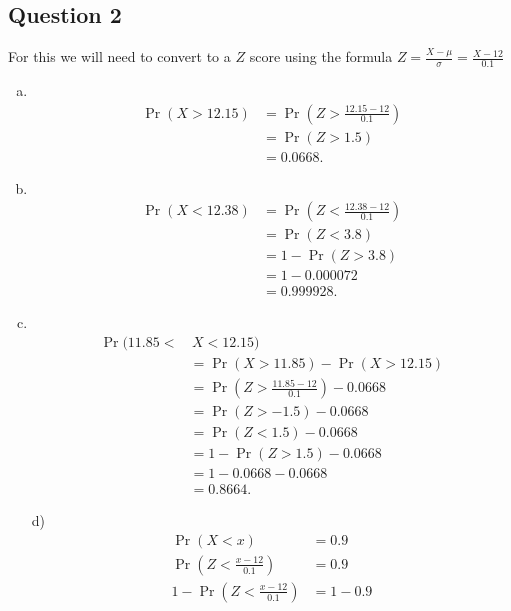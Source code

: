 \documentclass[12pt]{article}
\begin{document}
{\begin{minipage}[t]{0.98\textwidth}
\begin{minipage}[t]{0.47\textwidth}
\subsection*{Question 2}
For this we will need to convert to a $Z$ score using the formula $Z = \frac{X-\mu}{\sigma} = \frac{X - 12}{0.1}$
\begin{enumerate}[a)]
\item \quad \\[-1.45cm]
\begin{align*}
\Pr(X > 12.15) &= \Pr(Z > \tfrac{12.15-12}{0.1}) \\
&= \Pr(Z > 1.5) \\
&= 0.0668.
\end{align*}
\item \quad \\[-1.45cm]
\begin{align*}
\Pr(X < 12.38) &= \Pr(Z < \tfrac{12.38-12}{0.1}) \\
&= \Pr(Z < 3.8) \\
&= 1-\Pr(Z > 3.8) \\
&= 1-0.000072 \\
&=0.999928.
\end{align*}
\item \quad \\[-1.45cm]
\begin{align*}
\Pr(11.85 < &\,X < 12.15) \\&= \Pr(X > 11.85) - \Pr(X > 12.15) \\
&= \Pr(Z > \tfrac{11.85-12}{0.1}) - 0.0668 \\
&= \Pr(Z > -1.5) - 0.0668 \\
&= \Pr(Z < 1.5) - 0.0668 \\
&= 1 - \Pr(Z > 1.5) - 0.0668 \\
&= 1 - 0.0668 - 0.0668 \\
&= 0.8664.
\end{align*}
\end{enumerate}
\end{minipage}\hspace{0.055\textwidth}
\begin{minipage}[t]{0.47\textwidth}
\begin{enumerate}[a)]
\item[d)] \quad \\[-1.45cm]
\begin{align*}
\Pr(X < x) &= 0.9 \\
\Pr(Z < \tfrac{x-12}{0.1}) &= 0.9 \\
1 - \Pr(Z < \tfrac{x-12}{0.1}) &= 1 - 0.9 \\

\end{align*}
\end{enumerate}
\end{minipage}
\end{minipage}}
\end{document}

